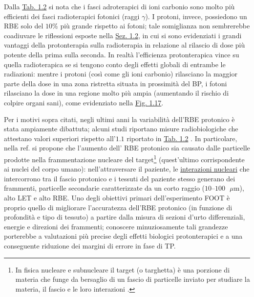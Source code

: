 \documentclass[12pt,a4paper,twoside]{report}
\begin{document}
	Dalla \hyperref[tab:let_rbe]{Tab. 1.2} si nota che i fasci adroterapici di ioni carbonio sono molto più efficienti dei fasci radioterapici fotonici (raggi $\gamma$). I protoni, invece, possiedono un RBE solo del $10\%$ più grande rispetto ai fotoni; tale somiglianza non sembrerebbe coadiuvare le riflessioni esposte nella \hyperref[sec:1.2]{Sez. 1.2}, in cui si sono evidenziati i grandi vantaggi della protonterapia sulla radioterapia in relazione al rilascio di dose più potente della prima sulla seconda. In realtà l'efficienza protonterapica vince su quella radioterapica se si tengono conto degli effetti globali di entrambe le radiazioni: mentre i protoni (così come gli ioni carbonio) rilasciano la maggior parte della dose in una zona ristretta situata in prossimità del BP, i fotoni rilasciano la dose in una regione molto più ampia (aumentando il rischio di colpire organi sani), come evidenziato nella \hyperref[fig:photon]{Fig. 1.17}.
	
	Per i motivi sopra citati, negli ultimi anni la variabilità dell'RBE protonico è stata ampiamente dibattuta; alcuni studi riportano misure radiobiologiche che attestano valori superiori rispetto all'$1.1$ riportato in \hyperref[tab:let_rbe]{Tab. 1.2} \cite{Tang1997-wb}. In particolare, nella ref. \cite{cancers7010353} si propone che l'aumento dell' RBE protonico sia causato dalle particelle prodotte nella frammentazione nucleare del target\footnote{In fisica nucleare e subnucleare il target (o targhetta) è una porzione di materia che funge da bersaglio di un fascio di particelle inviato per studiare la materia, il fascio e le loro interazioni \cite{treccani_target}.} (quest'ultimo corrispondente ai nuclei del corpo umano): nell'attraversare il paziente, le \hyperref[par:interazioni_nucleari]{interazioni nucleari} che intercorrono tra il fascio protonico e i tessuti del paziente stesso generano dei frammenti, particelle secondarie caratterizzate da un corto raggio ($10$--$100\mbox{ }\mu\mbox{m}$), alto LET e alto RBE. Uno degli obiettivi primari dell'esperimento FOOT è proprio quello di migliorare l'accuratezza dell'RBE protonico (in funzione di profondità e tipo di tessuto) a partire dalla misura di sezioni d'urto differenziali, energie e direzioni dei frammenti; conoscere minuziosamente tali grandezze porterebbe a valutazioni più precise degli effetti biologici protonterapici e a una conseguente riduzione dei margini di errore in fase di TP.
		
\end{document}
